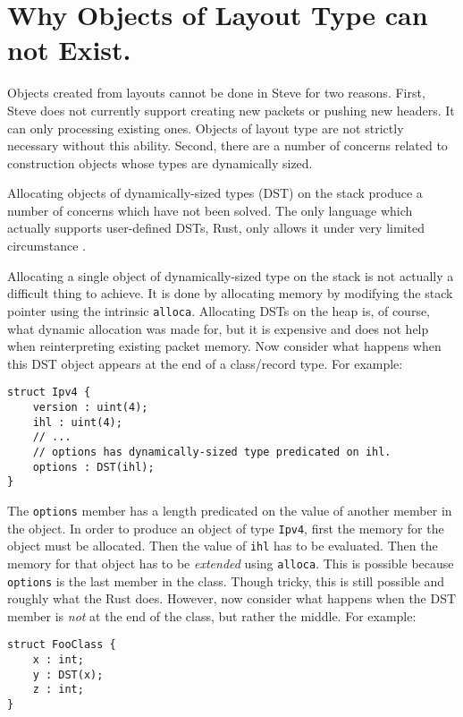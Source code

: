 \section{Why Objects of Layout Type can not Exist.} \label{guide:no_dst}

Objects created from layouts cannot be done in Steve for two reasons.
First, Steve does not currently support creating new packets or pushing new headers. 
It can only processing existing ones. 
Objects of layout type are not strictly necessary without this ability.
Second, there are a number of concerns related to construction objects whose
types are dynamically sized.

Allocating objects of dynamically-sized types (DST) on the stack produce a number of concerns which have not been solved.
The only language which actually supports user-defined DSTs, Rust, only allows it under 
very limited circumstance \cite{rust_dst_std}.

Allocating a single object of dynamically-sized type on the stack is not actually a difficult thing to achieve. 
It is done by allocating memory by modifying the stack pointer using the intrinsic
\texttt{alloca}. 
Allocating DSTs on the heap is, of course, what dynamic allocation was made for, but
it is expensive and does not help when reinterpreting existing packet memory.
Now consider what happens when this DST object appears at the end of a class/record
type. For example:

\begin{codepage}
\begin{lstlisting}
struct Ipv4 {
	version : uint(4);
	ihl : uint(4);
	// ...
	// options has dynamically-sized type predicated on ihl.
	options : DST(ihl); 
}
\end{lstlisting}
\end{codepage}

The \texttt{options} member has a length predicated on the value
of another member in the object. In order to produce an object of type \texttt{Ipv4},
first the memory for the object must be allocated. Then the value of \texttt{ihl}
has to be evaluated. Then the memory for that object has to be \emph{extended}
using \texttt{alloca}. This is possible because \texttt{options} is the last member in the class. Though tricky, this is still possible and roughly what the Rust does.
However, now consider what happens when the DST member is \emph{not} at the end
of the class, but rather the middle. For example:

\begin{codepage}
\begin{lstlisting}
struct FooClass {
	x : int;
	y : DST(x);
	z : int;
}
\end{lstlisting}
\end{codepage}

